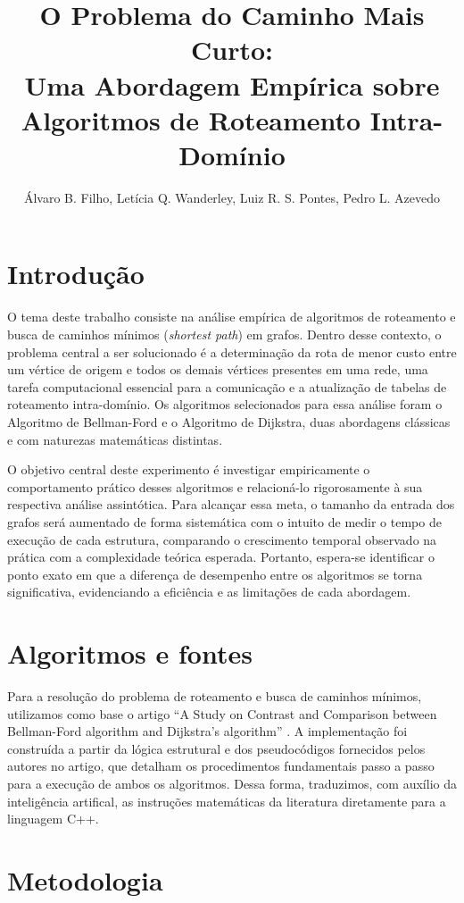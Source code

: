 \documentclass[12pt]{article}
\title{O Problema do Caminho Mais Curto:\\ Uma Abordagem Empírica
sobre Algoritmos de Roteamento Intra-Domínio}
\author{Álvaro B. Filho\inst{1}, Letícia Q. Wanderley\inst{1}, Luiz
R. S. Pontes\inst{1}, Pedro L. Azevedo\inst{1} }
\begin{document}
\maketitle

\section{Introdução}

O tema deste trabalho consiste na análise empírica de algoritmos de
roteamento e busca de caminhos mínimos (\textit{shortest path}) em
grafos. Dentro desse contexto, o problema central a ser solucionado
é a determinação da rota de menor custo entre um vértice de origem
e todos os demais vértices presentes em uma rede, uma tarefa
computacional essencial para a comunicação e a atualização de
tabelas de roteamento intra-domínio. Os algoritmos selecionados para
essa análise foram o Algoritmo de Bellman-Ford e o Algoritmo de Dijkstra,
duas abordagens clássicas e com naturezas matemáticas distintas.

O objetivo central deste experimento é investigar empiricamente o
comportamento prático desses algoritmos e relacioná-lo rigorosamente
à sua respectiva análise assintótica. Para alcançar essa meta, o tamanho
da entrada dos grafos será aumentado de forma sistemática com o intuito
de medir o tempo de execução de cada estrutura, comparando o crescimento
temporal observado na prática com a complexidade teórica esperada. Portanto,
espera-se identificar o ponto exato em que a diferença de desempenho entre os
algoritmos se torna significativa, evidenciando a eficiência e as limitações
de cada abordagem.

\section{Algoritmos e fontes}

Para a resolução do problema de roteamento e busca de caminhos
mínimos, utilizamos como base o artigo ``A Study on Contrast and
Comparison between Bellman-Ford algorithm and Dijkstra's algorithm''
\cite{thippeswamy}. A implementação foi construída a partir da lógica
estrutural e dos pseudocódigos fornecidos pelos
autores no artigo, que detalham os procedimentos fundamentais passo
a passo para a execução de ambos os algoritmos. Dessa forma, traduzimos,
com auxílio da inteligência artifical, as instruções matemáticas da
literatura diretamente para a linguagem C++.

\section{Metodologia}
\end{document}
